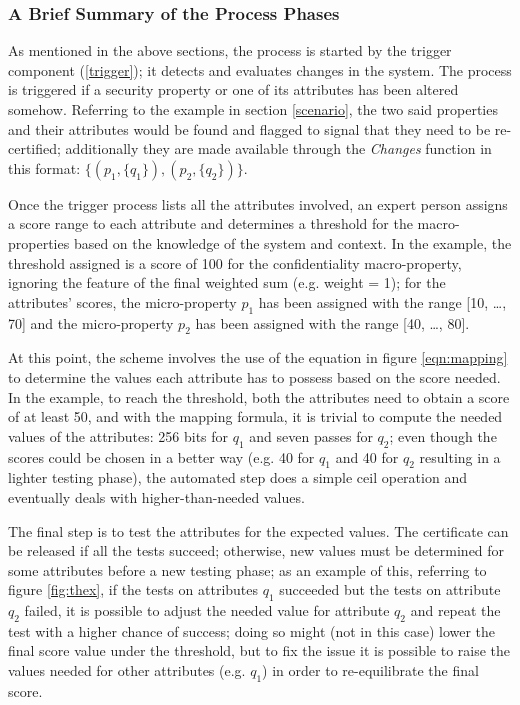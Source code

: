 \subsubsection{A Brief Summary of the Process Phases}
As mentioned in the above sections, the process is started by the trigger component (\ref{trigger}); it detects and evaluates changes in the system. The process is triggered if a security property or one of its attributes has been altered somehow. Referring to the example in section \ref{scenario}, the two said properties and their attributes would be found and flagged to signal that they need to be re-certified; additionally they are made available through the \textit{Changes} function in this format: \(\{ (p_1, \{q_1\}), (p_2, \{q_2\}) \}\).

Once the trigger process lists all the attributes involved, an expert person assigns a score range to each attribute and determines a threshold for the macro-properties based on the knowledge of the system and context. In the example, the threshold assigned is a score of 100 for the confidentiality macro-property, ignoring the feature of the final weighted sum (e.g. weight = 1); for the attributes' scores, the micro-property \(p_1\) has been assigned with the range [10, \dots, 70] and the micro-property \(p_2\) has been assigned with the range [40, \dots, 80].

At this point, the scheme involves the use of the equation in figure \ref{eqn:mapping} to determine the values each attribute has to possess based on the score needed. In the example, to reach the threshold, both the attributes need to obtain a score of at least 50, and with the mapping formula, it is trivial to compute the needed values of the attributes: 256 bits for \(q_1\) and seven passes for \(q_2\); even though the scores could be chosen in a better way (e.g. 40 for \(q_1\) and 40 for \(q_2\) resulting in a lighter testing phase), the automated step does a simple ceil operation and eventually deals with higher-than-needed values.

The final step is to test the attributes for the expected values. The certificate can be released if all the tests succeed; otherwise, new values must be determined for some attributes before a new testing phase; as an example of this, referring to figure \ref{fig:thex}, if the tests on attributes \(q_1\) succeeded but the tests on attribute \(q_2\) failed, it is possible to adjust the needed value for attribute \(q_2\) and repeat the test with a higher chance of success; doing so might (not in this case) lower the final score value under the threshold, but to fix the issue it is possible to raise the values needed for other attributes (e.g. \(q_1\)) in order to re-equilibrate the final score.

